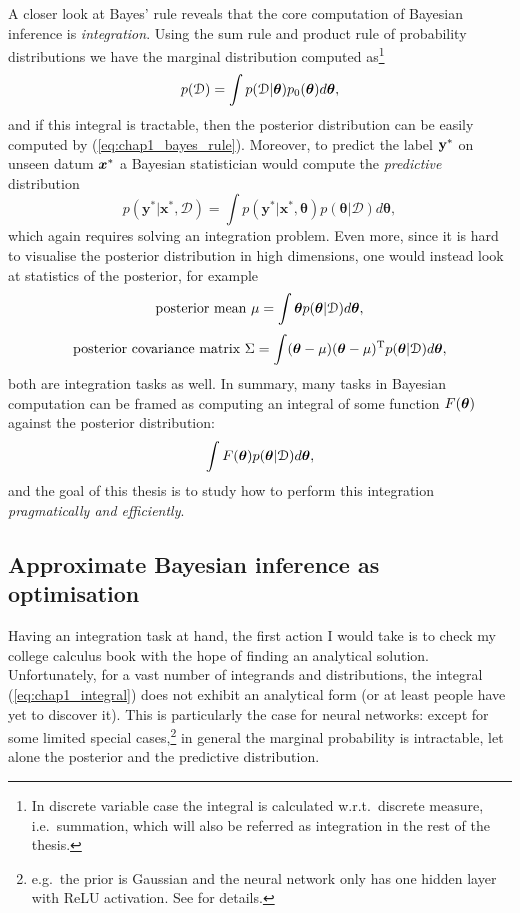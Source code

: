 A closer look at Bayes' rule reveals that the core computation of Bayesian inference is \emph{integration}. Using the sum rule and product rule of probability distributions we have the marginal distribution computed as\footnote{In discrete variable case the integral is calculated w.r.t.~discrete measure, i.e.~summation, which will also be referred as integration in the rest of the thesis.}
$$p(\mathcal{D}) = \int p(\mathcal{D} | \bm{\theta}) p_0(\bm{\theta}) d\bm{\theta},$$
and if this integral is tractable, then the posterior distribution can be easily computed by (\ref{eq:chap1_bayes_rule}). Moreover, to predict the label $\mathbf{y}^*$ on unseen datum $\bm{x}^*$ a Bayesian statistician would compute the \emph{predictive} distribution
\begin{equation}
p(\bm{y}^*|\bm{x}^*, \mathcal{D}) = \int p(\bm{y}^*|\bm{x}^*, \bm{\theta}) p(\bm{\theta}|\mathcal{D}) d\bm{\theta},
\label{eq:chap1_bayesian_inference}
\end{equation}
which again requires solving an integration problem. Even more, since it is hard to visualise the posterior distribution in high dimensions, one would instead look at statistics of the posterior, for example
$$ \text{posterior mean  } \mu = \int \bm{\theta} p(\bm{\theta} | \mathcal{D}) d \bm{\theta}, $$
$$\text{posterior covariance matrix  } \Sigma = \int (\bm{\theta} -\mu) (\bm{\theta} - \mu)^{\text{T}} p(\bm{\theta} | \mathcal{D}) d \bm{\theta},$$
both are integration tasks as well. In summary, many tasks in Bayesian computation can be framed as computing an integral of some function $F(\bm{\theta})$ against the posterior distribution:
\begin{equation}
\int F(\bm{\theta}) p(\bm{\theta} | \mathcal{D}) d \bm{\theta},
\label{eq:chap1_integral}
\end{equation}
and the goal of this thesis is to study how to perform this integration \emph{pragmatically and efficiently}.

\subsection{Approximate Bayesian inference as optimisation}
\label{sec:chap1_approx_infer}

Having an integration task at hand, the first action I would take is to check my college calculus book with the hope of finding an analytical solution. Unfortunately, for a vast number of integrands and distributions, the integral (\ref{eq:chap1_integral}) does not exhibit an analytical form (or at least people have yet to discover it). This is particularly the case for neural networks: except for some limited special cases,\footnote{e.g.~the prior is Gaussian and the neural network only has one hidden layer with ReLU activation. See \cite{hernandez-lobato:pbp2015} for details.} in general the marginal probability is intractable, let alone the posterior and the predictive distribution.

